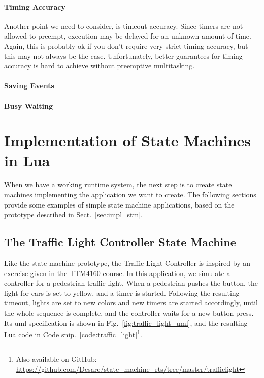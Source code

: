 \paragraph{Timing Accuracy} Another point we need to consider, is timeout accuracy. Since timers are not allowed to preempt, execution may be delayed for an unknown amount of time. Again, this is probably ok if you don't require very strict timing accuracy, but this may not always be the case. Unfortunately, better guarantees for timing accuracy is hard to achieve without preemptive multitasking.

\paragraph{Saving Events}

\paragraph{Busy Waiting}

\section{Implementation of State Machines in Lua}
\label{sec:impl_state_machines}
When we have a working runtime system, the next step is to create state machines implementing the application we want to create. The following sections provide some examples of simple state machine applications, based on the prototype described in Sect.~\ref{sec:impl_stm}.

\subsection{The Traffic Light Controller State Machine}
\label{sec:impl_traffic_light}
Like the state machine prototype, the Traffic Light Controller is inspired by an exercise given in the TTM4160 course. In this application, we simulate a controller for a pedestrian traffic light. When a pedestrian pushes the button, the light for cars is set to yellow, and a timer is started. Following the resulting timeout, lights are set to new colors and new timers are started accordingly, until the whole sequence is complete, and the controller waits for a new button press. Its \gls{uml} specification is shown in Fig.~\ref{fig:traffic_light_uml}, and the resulting Lua code in Code snip.~\ref{code:traffic_light}\footnote{Also available on GitHub: \url{https://github.com/Desarc/state_machine_rts/tree/master/trafficlight}}.

